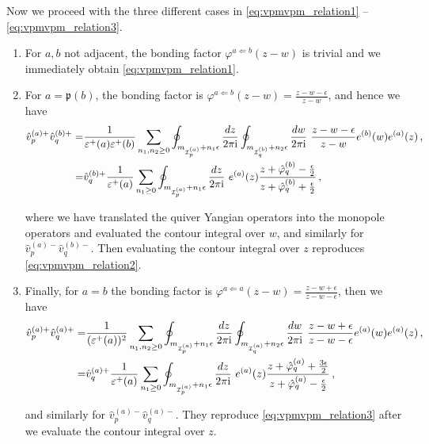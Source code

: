 \documentclass[12pt,a4paper]{article}
\renewcommand{\(}{\left(}
\renewcommand{\)}{\right)}
\newcommand{\eps}{\epsilon}
\renewcommand{\(}{\left(}
\renewcommand{\)}{\right)}
\begin{document}
Now we proceed with the three different cases in \eqref{eq:vpmvpm_relation1} -- \eqref{eq:vpmvpm_relation3}.
\begin{enumerate}
\item For $a,b$ not adjacent, the bonding factor $\varphi^{a\Leftarrow b}(z-w)$ is trivial and we immediately obtain \eqref{eq:vpmvpm_relation1}.


\item For $a=\mathfrak{p}(b)$, the bonding factor is $\varphi^{a\Leftarrow b}(z-w)=\frac{z-w-\epsilon}{z-w}$, and hence we have
{\small
    \begin{align}
\hat{v}^{(a)+}_p\hat{v}^{(b)+}_q=&\frac{1}{\varepsilon^+(a)\varepsilon^+(b)}\sum_{n_1,n_2\geq 0} \oint_{m_{\mathcal{I}^{(a)}_{p}}+n_1\epsilon}\frac{dz}{2\pi \text{i}} \oint_{m_{\mathcal{I}^{(b)}_{q}}+n_2\epsilon}\frac{dw}{2\pi \text{i}}\ \frac{z-w-\epsilon}{z-w} e^{(b)}(w)e^{(a)}(z)\,,\notag\\
=&\hat{v}^{(b)+}_q\frac{1}{\varepsilon^+(a)}\sum_{n_1\geq 0} \oint_{m_{\mathcal{I}^{(a)}_{p}}+n_1\epsilon}\frac{dz}{2\pi \text{i}} \  e^{(a)}(z)\frac{z+\hat{\varphi}^{(b)}_q-\frac{\epsilon}{2}}{z+\hat{\varphi}^{(b)}_q+\frac{\epsilon}{2}}\,,
\end{align}
}

\noindent where we have translated the quiver Yangian operators into the monopole operators and evaluated the contour integral over $w$, and similarly for $\hat{v}^{(a)-}_p\hat{v}^{(b)-}_q$.
Then evaluating the contour integral over $z$ reproduces \eqref{eq:vpmvpm_relation2}.

\item Finally, for $a=b$ the bonding factor is $\varphi^{a\Leftarrow a}(z-w)=\frac{z-w+\epsilon}{z-w-\eps}$, then we have
{\small
    \begin{align}
\hat{v}^{(a)+}_p\hat{v}^{(a)+}_q=&\frac{1}{(\varepsilon^+(a))^2}\sum_{n_1,n_2\geq 0} \oint_{m_{\mathcal{I}^{(a)}_{p}}+n_1\epsilon}\frac{dz}{2\pi \text{i}} \oint_{m_{\mathcal{I}^{(a)}_{q}}+n_2\epsilon}\frac{dw}{2\pi \text{i}}\ \frac{z-w+\epsilon}{z-w-\epsilon} e^{(a)}(w)e^{(a)}(z)\,,\notag\\
=&\hat{v}^{(a)+}_q\frac{1}{\varepsilon^+(a)} \sum_{n_1\geq 0} \oint_{m_{\mathcal{I}^{(a)}_{p}}+n_1\epsilon}\frac{dz}{2\pi \text{i}} \  e^{(a)}(z)\frac{z+\hat{\varphi}^{(a)}_q+\frac{3\epsilon}{2}}{z+\hat{\varphi}^{(a)}_q-\frac{\epsilon}{2}}\,,
\end{align}
}

\noindent and similarly for $\hat{v}^{(a)-}_p\hat{v}^{(a)-}_q$. 
They reproduce \eqref{eq:vpmvpm_relation3} after we evaluate the contour integral over $z$.
\end{enumerate}
\end{document}
